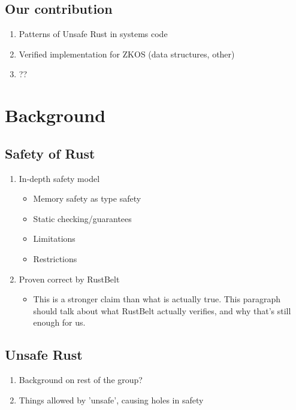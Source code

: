 \documentclass{article}
\begin{document}
\subsection{Our contribution}
\begin{enumerate}
    \item Patterns of Unsafe Rust in systems code
    \item Verified implementation for ZKOS (data structures, other)
    \item ??
\end{enumerate}

\section{Background}
\subsection{Safety of Rust}
\begin{enumerate}
    \item In-depth safety model
    \begin{itemize}
        \item Memory safety as type safety
        \item Static checking/guarantees
        \item Limitations
        \item Restrictions
    \end{itemize}
    \item Proven correct by RustBelt
    \begin{itemize}
        \item This is a stronger claim than what is actually true. This paragraph should talk about what RustBelt actually verifies, and why that's still enough for us.
    \end{itemize}
\end{enumerate}

\subsection{Unsafe Rust}
\begin{enumerate}
    \item Background on rest of the group?
    \item Things allowed by 'unsafe', causing holes in safety
\end{enumerate}
\end{document}
